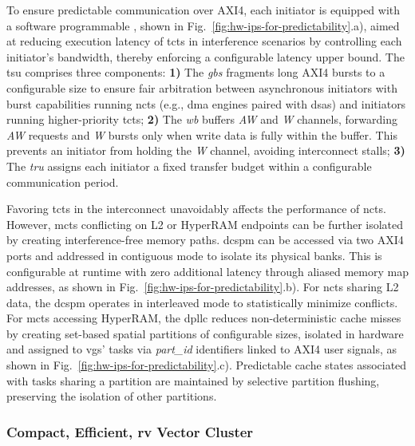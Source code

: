 To ensure predictable communication over AXI4, each initiator is equipped with a software programmable , shown in Fig.~\ref{fig:hw-ips-for-predictability}.a), aimed at reducing execution latency of \glspl{tct} in interference scenarios by controlling each initiator's bandwidth, thereby enforcing a configurable latency upper bound. The \gls{tsu} comprises three components: 
\textbf{1)} The \textit{\gls{gbs}} fragments long AXI4 bursts to a configurable size to ensure fair arbitration between asynchronous initiators with burst capabilities running \glspl{nct} (e.g., \gls{dma} engines paired with \glspl{dsa}) and initiators running higher-priority \glspl{tct}; 
\textbf{2)} The \textit{\gls{wb}} buffers \emph{AW} and \emph{W} channels, forwarding \emph{AW} requests and \emph{W} bursts only when write data is fully within the buffer. This prevents an initiator from holding the \emph{W} channel, avoiding interconnect stalls; 
\textbf{3)} The \textit{\gls{tru}} assigns each initiator a fixed transfer budget within a configurable communication period. 

Favoring \glspl{tct} in the interconnect unavoidably affects the performance of \glspl{nct}. However, \glspl{mct} conflicting on L2 or HyperRAM endpoints can be further isolated by creating interference-free memory paths. 
%
\gls{dcspm} can be accessed via two AXI4 ports and addressed in contiguous mode to isolate its physical banks. This is configurable at runtime with zero additional latency through aliased memory map addresses, as shown in Fig.~\ref{fig:hw-ips-for-predictability}.b). For \glspl{nct} sharing L2 data, the \gls{dcspm} operates in interleaved mode to statistically minimize conflicts. 
%
For \glspl{mct} accessing HyperRAM, the \gls{dpllc} reduces non-deterministic cache misses by creating set-based spatial partitions of configurable sizes, isolated in hardware and assigned to \glspl{vg}' tasks via \textit{part\_id} identifiers linked to AXI4 user signals, as shown in Fig.~\ref{fig:hw-ips-for-predictability}.c). Predictable cache states associated with tasks sharing a partition are maintained by selective partition flushing, preserving the isolation of other  partitions. 

\subsubsection{Compact, Efficient, \gls{rv} Vector Cluster}
\label{sec:vector}

